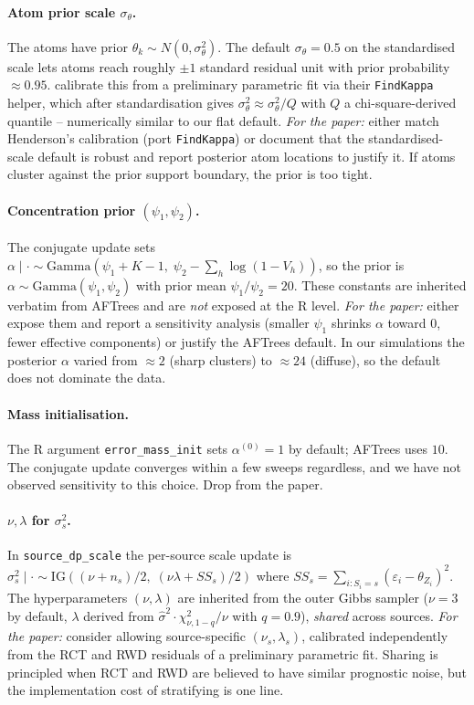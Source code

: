 \documentclass[11pt]{article}
\newcommand{\1}{\mathbf{1}}
\begin{document}
\paragraph{Atom prior scale $\sigma_\theta$.} The atoms have prior $\theta_k \sim N(0, \sigma_\theta^2)$. The default $\sigma_\theta = 0.5$ on the standardised scale lets atoms reach roughly $\pm 1$ standard residual unit with prior probability $\approx 0.95$. \citet{henderson2020individualized} calibrate this from a preliminary parametric fit via their \texttt{FindKappa} helper, which after standardisation gives $\sigma_\theta^2 \approx \sigma_\theta^2/Q$ with $Q$ a chi-square-derived quantile -- numerically similar to our flat default. \emph{For the paper:} either match Henderson's calibration (port \texttt{FindKappa}) or document that the standardised-scale default is robust and report posterior atom locations to justify it. If atoms cluster against the prior support boundary, the prior is too tight.

\paragraph{Concentration prior $(\psi_1, \psi_2)$.} The conjugate update sets $\alpha \mid \cdot \sim \mathrm{Gamma}(\psi_1 + K - 1,\; \psi_2 - \sum_h \log(1 - V_h))$, so the prior is $\alpha \sim \mathrm{Gamma}(\psi_1, \psi_2)$ with prior mean $\psi_1/\psi_2 = 20$. These constants are inherited verbatim from AFTrees and are \emph{not} exposed at the R level. \emph{For the paper:} either expose them and report a sensitivity analysis (smaller $\psi_1$ shrinks $\alpha$ toward $0$, fewer effective components) or justify the AFTrees default. In our simulations the posterior $\alpha$ varied from $\approx 2$ (sharp clusters) to $\approx 24$ (diffuse), so the default does not dominate the data.

\paragraph{Mass initialisation.} The R argument \texttt{error\_mass\_init} sets $\alpha^{(0)} = 1$ by default; AFTrees uses $10$. The conjugate update converges within a few sweeps regardless, and we have not observed sensitivity to this choice. Drop from the paper.

\paragraph{$\nu, \lambda$ for $\sigma_s^2$.} In \texttt{source\_dp\_scale} the per-source scale update is $\sigma_s^2 \mid \cdot \sim \mathrm{IG}((\nu + n_s)/2,\; (\nu\lambda + SS_s)/2)$ where $SS_s = \sum_{i: S_i = s}(\varepsilon_i - \theta_{Z_i})^2$. The hyperparameters $(\nu, \lambda)$ are inherited from the outer Gibbs sampler ($\nu = 3$ by default, $\lambda$ derived from $\hat\sigma^2 \cdot \chi^2_{\nu, 1-q}/\nu$ with $q = 0.9$), \emph{shared} across sources. \emph{For the paper:} consider allowing source-specific $(\nu_s, \lambda_s)$, calibrated independently from the RCT and RWD residuals of a preliminary parametric fit. Sharing is principled when RCT and RWD are believed to have similar prognostic noise, but the implementation cost of stratifying is one line.
\end{document}
